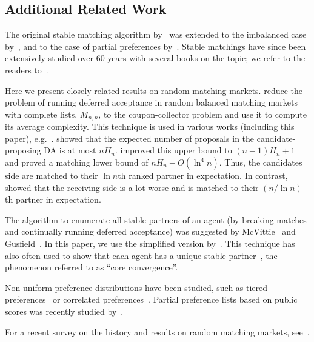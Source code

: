 \documentclass[11pt]{amsart}
\begin{document}
\subsection{Additional Related Work}\label{sec:related}
The original stable matching algorithm by~\cite{gale1962college} was extended to the imbalanced case by~\cite{mcvitie1970stable}, and to the case of partial preferences by~\cite{gusfield1989stable}. Stable matchings have since been extensively studied over 60 years with several books on the topic;  we refer to the readers to~\cite{manlove2013algorithmics}.


Here we present closely related results on random-matching markets. \cite{wilson1972analysis, knuth1976mariages}  reduce the problem of running deferred acceptance in random balanced matching markets with complete lists, $M_{n,n}$, to the coupon-collector problem and use it to compute its average complexity.  This technique is used in various works (including this paper), e.g.~\cite{kanoria2021matching, ashlagi_et_al:LIPIcs.ITCS.2021.46,ashlagi2017unbalanced}. \cite{Wilson1972AnAO} showed that the expected number of proposals in the candidate-proposing DA is at most $n H_n$. \cite{knuth1976mariages} improved this upper bound to $(n-1) H_n +1$ and proved a matching lower bound of $n H_n - O(\ln^4 n)$.  Thus, the candidates side are matched to their $\ln n$th ranked partner in expectation. In contrast, \cite{pittel1989average} showed that the receiving side is a lot worse and is matched to their $(n/\ln n)$th partner in expectation.  


 The algorithm to enumerate all stable partners of an agent (by breaking matches and continually running deferred acceptance) was suggested by McVittie~\cite{mcvitie1971stable} and Gusfield~\cite{gusfield1987three}.  In this paper, we use the simplified version by~\cite{knuth1990stable}.  This technique has also often used to show that each agent has a unique stable partner~\cite{immorlica2005marriage, ashlagi2017unbalanced}, the phenomenon referred to as ``core convergence''.

 Non-uniform preference distributions have been studied, such as tiered preferences~\cite{ashlagi_et_al:LIPIcs.ITCS.2021.46} or correlated preferences~\cite{gimbert2021two}. Partial preference lists based on public scores was recently studied by~\cite{agarwal2023stable}. 
 
 For a recent survey on the history and results on random matching markets, see~\cite{mauras2021analysis}.
\end{document}
